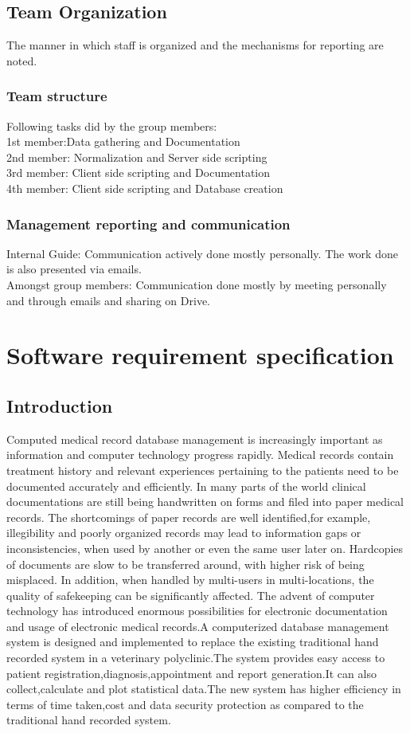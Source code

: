 \documentclass[oneside,a4paper,12pt]{book}
\begin{document}
 
\section{Team Organization}
The manner in which staff is organized and the mechanisms for reporting are noted.  
\subsection{Team structure}
Following tasks did by the group members:\\
1st member:Data gathering and
	Documentation\\
2nd member: Normalization and Server side scripting \\
3rd member: Client side scripting and Documentation \\
4th member: Client side scripting and	Database creation


\subsection{Management reporting and communication}
Internal Guide: Communication actively done mostly personally. The work done is also presented via emails. \\
Amongst group members: Communication done mostly by meeting personally and through emails and sharing on Drive.

 
\chapter{Software requirement specification  }

\section{Introduction}
Computed medical record database management is increasingly important as information and computer technology progress rapidly. Medical records contain treatment history and relevant experiences pertaining to the patients need to be documented accurately and efficiently. In many parts of the world clinical documentations are still being handwritten on forms and filed into paper medical records. The shortcomings of paper records are well identified,for example, illegibility and poorly organized records may lead to information gaps or inconsistencies, when used by another or even the same user later on. Hardcopies of documents are slow to be transferred around, with higher risk of being misplaced. In addition, when handled by multi-users in multi-locations, the quality of safekeeping can be significantly affected. The advent of computer technology has introduced enormous possibilities for electronic documentation and usage of electronic medical records.A computerized database management system is designed and implemented to replace the existing traditional hand recorded system in a veterinary polyclinic.The system provides easy access to patient registration,diagnosis,appointment and report generation.It can also collect,calculate and plot statistical data.The new system has higher efficiency in terms of time taken,cost and data security protection as compared to the traditional hand recorded system.  
\end{document}
